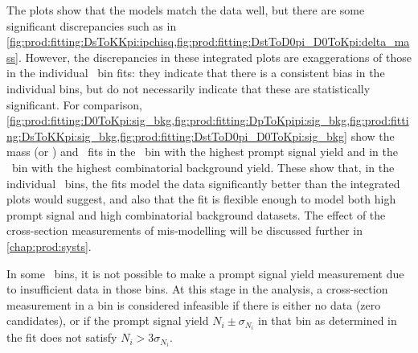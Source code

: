 The plots show that the models match the data well, but there are some 
significant discrepancies such as in 
\cref{fig:prod:fitting:DsToKKpi:ipchisq,fig:prod:fitting:DstToD0pi_D0ToKpi:delta_mass}.
However, the discrepancies in these integrated plots are exaggerations of those 
in the individual \pTy\ bin fits: they indicate that there is a consistent bias 
in the individual bins, but do not necessarily indicate that these are 
statistically significant.
For comparison, 
\cref{fig:prod:fitting:D0ToKpi:sig_bkg,fig:prod:fitting:DpToKpipi:sig_bkg,fig:prod:fitting:DsToKKpi:sig_bkg,fig:prod:fitting:DstToD0pi_D0ToKpi:sig_bkg} 
show the mass (or \deltam) and \lnipchisq\ fits in the \pTy\ bin with the 
highest prompt signal yield and in the \pTy\ bin with the highest combinatorial 
background yield.
These show that, in the individual \pTy\ bins, the fits model the data 
significantly better than the integrated plots would suggest, and also that the 
fit is flexible enough to model both high prompt signal and high combinatorial 
background datasets.
The effect of the cross-section measurements of mis-modelling will be discussed 
further in \cref{chap:prod:systs}.

In some \pTy\ bins, it is not possible to make a prompt signal yield 
measurement due to insufficient data in those bins.
At this stage in the analysis, a cross-section measurement in a bin is 
considered infeasible if there is either no data (zero candidates), or if the 
prompt signal yield $N_{i} \pm \sigma_{N_{i}}$ in that bin as determined in the 
fit does not satisfy $N_{i} > 3\sigma_{N_{i}}$.

